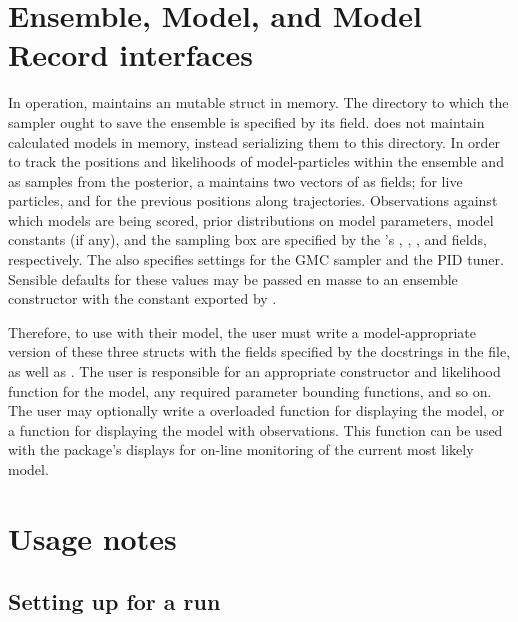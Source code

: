 \section{Ensemble, Model, and Model Record interfaces}
In operation,  maintains an  mutable struct in memory. The directory to which the sampler ought to save the ensemble is specified by its  field.  does not maintain calculated models in memory, instead serializing them to this directory. In order to track the positions and likelihoods of model-particles within the ensemble and as samples from the posterior, a  maintains two vectors of  as fields;  for live particles, and  for the previous positions along trajectories. Observations against which models are being scored, prior distributions on model parameters, model constants (if any), and the sampling box are specified by the 's , , , and  fields, respectively. The  also specifies settings for the GMC sampler and the PID tuner. Sensible defaults for these values may be passed en masse to an ensemble constructor with the  constant exported by .

Therefore, to use  with their model, the user must write a model-appropriate version of these three structs with the fields specified by the docstrings in the  file, as well as . The user is responsible for an appropriate constructor and likelihood function for the model, any required parameter bounding functions, and so on. The user may optionally write a overloaded  function for displaying the model, or a  function for displaying the model with observations. This function can be used with the package's  displays for on-line monitoring of the current most likely model.

\section{Usage notes}
\subsection{Setting up for a run}


